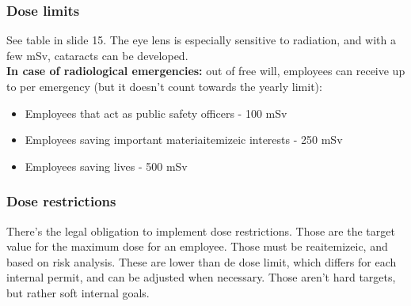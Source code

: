 \subsubsection{Dose limits}
See table in slide 15. The eye lens is especially sensitive to radiation, and with a few mSv, cataracts can be developed.\\
\textbf{In case of radiological emergencies:} out of free will, employees can receive up to per emergency (but it doesn't count towards the yearly limit):
\begin{itemize}
	\item Employees that act as public safety officers - 100 mSv
	\item Employees saving important materiaitemizeic interests - 250 mSv
	\item Employees saving lives - 500 mSv
\end{itemize}

\subsubsection{Dose restrictions}
There's the legal obligation to implement dose restrictions. Those are the target value for the maximum dose for an employee. Those must be reaitemizeic, and based on risk analysis. These are lower than de dose limit, which differs for each internal permit, and can be adjusted when necessary. Those aren't hard targets, but rather soft internal goals.

